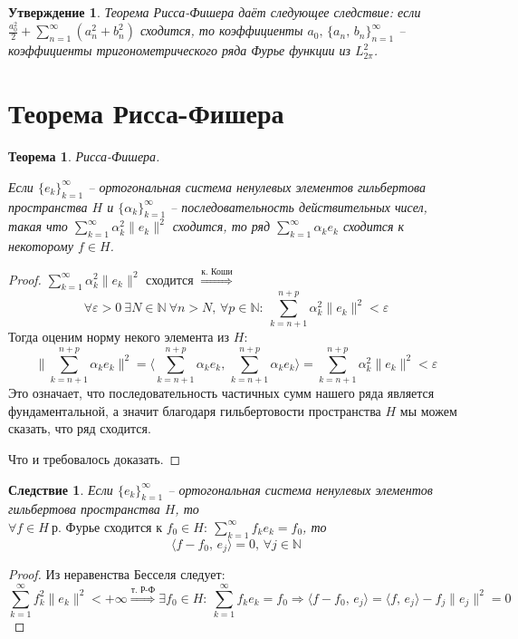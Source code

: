\documentclass[a4paper,12pt]{article}
\theoremstyle{plain}
\newtheorem{theorem}{Теорема}[section]
\newtheorem{proposition}{Утверждение}[section]
\newtheorem*{corollary}{Следствие}
\theoremstyle{definition}
\theoremstyle{remark}
\begin{document}
\begin{proposition}
	Теорема Рисса-Фишера даёт следующее следствие: если $\frac{a_0^2}{2} + \sum_{n = 1}^\infty (a_n^2 + b_n^2)$ сходится, то коэффициенты $a_0,\, \{a_n,\,b_n\}_{n = 1}^\infty$ -- коэффициенты тригонометрического ряда Фурье функции из $L_{2\pi}^2$.
\end{proposition}

\section{Теорема Рисса-Фишера}
\begin{theorem}
	Рисса-Фишера.

	Если $\{e_k\}_{k = 1}^\infty$ -- ортогональная система ненулевых элементов гильбертова пространства $H$ и $\{\alpha_k\}_{k = 1}^\infty$ -- последовательность действительных чисел, такая что $\sum_{k = 1}^\infty \alpha_k^2 \|e_k\|^2$ сходится, то ряд $\sum_{k = 1}^\infty \alpha_ke_k$ сходится к некоторому $f \in H$.
\end{theorem}

\begin{proof}
	$\sum_{k = 1}^\infty \alpha_k^2\|e_k\|^2$ сходится $\stackrel{\text{к. Коши}}{\Rightarrow}$
	\[\forall \varepsilon > 0 \: \exists N \in \mathbb{N} \: \forall n > N,\, \forall p \in \mathbb{N}:\: \sum_{k = n + 1}^{n + p} \alpha_k^2\|e_k\|^2 < \varepsilon\]
	Тогда оценим норму некого элемента из $H$:
	\[\|\sum_{k = n + 1}^{n + p}\alpha_ke_k\|^2 = \langle\sum_{k = n + 1}^{n + p}\alpha_ke_k,\, \sum_{k = n + 1}^{n + p}\alpha_ke_k\rangle = \sum_{k = n + 1}^{n + p}\alpha_k^2\|e_k\|^2 < \varepsilon\]
	Это означает, что последовательность частичных сумм нашего ряда является фундаментальной, а значит благодаря гильбертовости пространства $H$ мы можем сказать, что ряд сходится.

	Что и требовалось доказать.
\end{proof}

\begin{corollary}
	Если $\{e_k\}_{k = 1}^\infty$ -- ортогональная система ненулевых элементов гильбертова пространства $H$, то $\forall f \in H\: \text{р. Фурье сходится к }f_0 \in H:\: \sum_{k = 1}^\infty f_ke_k = f_0$, то
	\[\langle f - f_0,\, e_j\rangle = 0,\, \forall j \in \mathbb{N}\]
\end{corollary}

\begin{proof}
	Из неравенства Бесселя следует:
	\[\sum_{k = 1}^\infty f_k^2\|e_k\|^2 < +\infty \stackrel{\text{т. Р-Ф}}{\Rightarrow} \exists f_0 \in H :\: \sum_{k = 1}^\infty f_ke_k = f_0 \Rightarrow \langle f - f_0,\,e_j\rangle = \langle f,\,e_j\rangle - f_j\|e_j\|^2 = 0\]
\end{proof}
\end{document}
